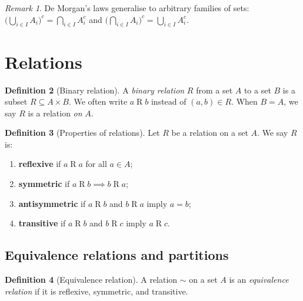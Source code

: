 \documentclass[12pt,a4paper,openany]{book}
\theoremstyle{definition}
\newtheorem{definition}{Definition}[chapter]
\theoremstyle{plain}
\theoremstyle{remark}
\newtheorem{remark}[definition]{Remark}
\begin{document}
\begin{remark}\label{rem:de-morgan-general}
De Morgan's laws generalise to arbitrary families of sets:
$\bigl(\bigcup_{i \in I} A_i\bigr)^c = \bigcap_{i \in I} A_i^c$ and
$\bigl(\bigcap_{i \in I} A_i\bigr)^c = \bigcup_{i \in I} A_i^c$.
\end{remark}

\section{Relations}
\label{sec:relations}

\begin{definition}[Binary relation]\label{def:relation}
A \emph{binary relation} $R$ from a set $A$ to a set $B$ is a subset
$R \subseteq A \times B$. We often write $a \mathrel{R} b$ instead of
$(a,b) \in R$. When $B = A$, we say $R$ is a relation \emph{on} $A$.
\end{definition}

\begin{definition}[Properties of relations]\label{def:relation-props}
Let $R$ be a relation on a set $A$. We say $R$ is:
\begin{enumerate}[label=(\roman*)]
  \item \textbf{reflexive} if $a \mathrel{R} a$ for all $a \in A$;
  \item \textbf{symmetric} if $a \mathrel{R} b \implies b \mathrel{R} a$;
  \item \textbf{antisymmetric} if $a \mathrel{R} b$ and $b \mathrel{R} a$
        imply $a = b$;
  \item \textbf{transitive} if $a \mathrel{R} b$ and $b \mathrel{R} c$
        imply $a \mathrel{R} c$.
\end{enumerate}
\end{definition}

\subsection{Equivalence relations and partitions}
\label{subsec:equiv-rel}

\begin{definition}[Equivalence relation]\label{def:equiv-rel}
A relation $\sim$ on a set $A$ is an \emph{equivalence relation} if it is
reflexive, symmetric, and transitive.
\end{definition}
\end{document}
